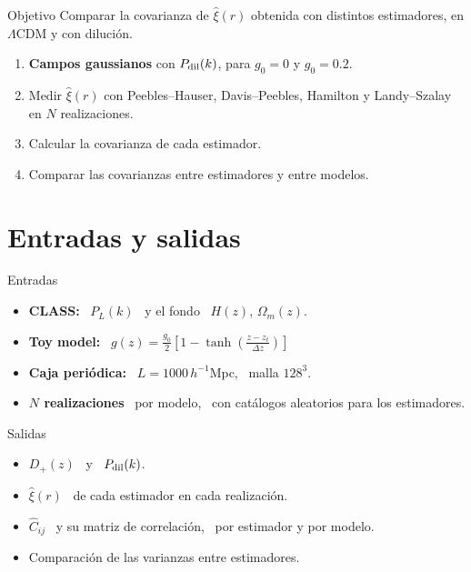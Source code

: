 \documentclass[aspectratio=169]{beamer}
\begin{document}
\begin{frame}{Objetivo}
  Comparar la covarianza de $\hat\xi(r)$ obtenida con distintos estimadores,
  en $\Lambda$CDM y con dilución.
  \vspace{1em}
  \begin{enumerate}
    \setlength\itemsep{0.9em}
    \item \textbf{Campos gaussianos} con $P_{\rm dil}(k)$, para $g_0=0$ y $g_0=0.2$.
    \item Medir $\hat\xi(r)$ con Peebles--Hauser, Davis--Peebles, Hamilton y Landy--Szalay
      en $N$ realizaciones.
    \item Calcular la covarianza de cada estimador.
    \item Comparar las covarianzas entre estimadores y entre modelos.
  \end{enumerate}
\end{frame}

\section{Entradas y salidas}

\begin{frame}{Entradas}
  \begin{itemize}
    \setlength\itemsep{1.4em}
    \item \textbf{CLASS:} \ $P_L(k)$ \ y el fondo \ $H(z)$, $\Omega_m(z)$.
    \item \textbf{Toy model:} \
      $\displaystyle g(z) = \frac{g_0}{2}\left[1 - \tanh\!\left(\frac{z-z_t}{\Delta z}\right)\right]$
    \item \textbf{Caja periódica:} \ $L=1000\,h^{-1}$Mpc, \ malla $128^3$.
    \item \textbf{$N$ realizaciones} \ por modelo, \ con catálogos aleatorios para los estimadores.
  \end{itemize}
\end{frame}

\begin{frame}{Salidas}
  \begin{itemize}
    \setlength\itemsep{1.4em}
    \item $D_+(z)$ \ y \ $P_{\rm dil}(k)$.
    \item $\hat\xi(r)$ \ de cada estimador en cada realización.
    \item $\hat C_{ij}$ \ y su matriz de correlación, \ por estimador y por modelo.
    \item Comparación de las varianzas entre estimadores.
  \end{itemize}
\end{frame}
\end{document}
